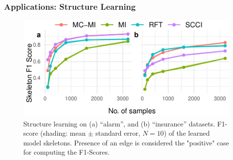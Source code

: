 \documentclass{beamer}
\begin{document}
\begin{frame}
	\frametitle{Applications: Structure Learning}
	\begin{figure}
		\centering
		\includegraphics{imgs/sl.pdf}
		\caption*{Structure learning on (a) ``alarm'', and (b)
		``insurance'' datasets.  F1-score (shading: mean $\pm$ standard
		error, $N=10$) of the learned model skeletons.  Presence of an
		edge is considered the "positive" case for computing the
		F1-Scores.}
	\end{figure}
\end{frame}
\end{document}
